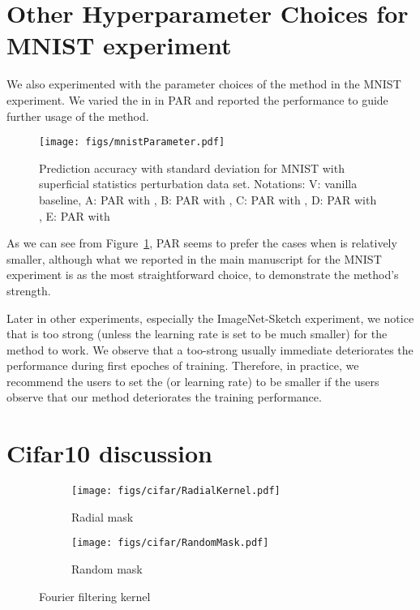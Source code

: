 \documentclass{article}
\begin{document}

  

\clearpage
\appendix

\section{Other Hyperparameter Choices for MNIST experiment}
\label{sec:mnist:hyper}
We also experimented with the parameter choices of the method in the MNIST experiment. 
We varied the  in  in PAR and reported the performance to guide further usage of the method. 

\begin{figure}
    \centering
    \texttt{[image: figs/mnistParameter.pdf]}
    \caption{Prediction accuracy with standard deviation for MNIST with superficial statistics perturbation data set. Notations: V: vanilla baseline, A: PAR with , B: PAR with , C: PAR with , D: PAR with , E: PAR with }
    \label{fig:mnistParameter}
\end{figure}

As we can see from Figure~\ref{fig:mnistParameter}, PAR seems to prefer the cases when  is relatively smaller, although what we reported in the main manuscript for the MNIST experiment is  as the most straightforward choice, to demonstrate the method's strength. 

Later in other experiments, especially the ImageNet-Sketch experiment, we notice that  is too strong (unless the learning rate is set to be much smaller) for the method to work. We observe that a too-strong  usually immediate deteriorates the performance during first epoches of training. Therefore, in practice, we recommend the users to set the  (or learning rate) to be smaller if the users observe that our method deteriorates the training performance. 


\newpage 
\section{Cifar10 discussion}
\label{sec:cifar10data}
\begin{figure}[h!]
  \centering
    \begin{subfigure}{.28\textwidth}
      \centering
      \texttt{[image: figs/cifar/RadialKernel.pdf]}
      \caption{Radial mask}
    \end{subfigure}
    \begin{subfigure}{.28\textwidth}
      \centering
      \texttt{[image: figs/cifar/RandomMask.pdf]}
      \caption{Random mask}
      \label{process}
    \end{subfigure}
\caption{Fourier filtering kernel}
\label{fig:kernel}
\end{figure}
\vspace{-0.5cm}
\end{document}
